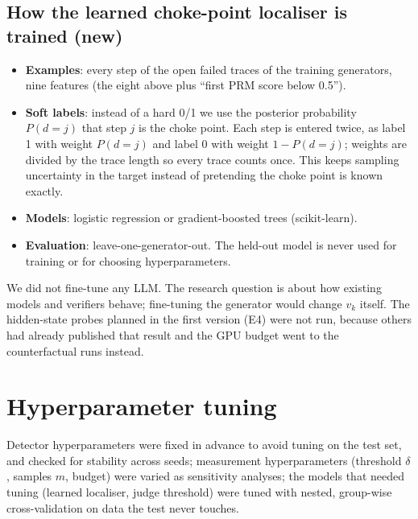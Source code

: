 \documentclass[11pt,a4paper]{article}
\begin{document}
\subsection{How the learned choke-point localiser is trained (new)}
\begin{itemize}
\item \textbf{Examples}: every step of the open failed traces of the training generators, nine
features (the eight above plus ``first PRM score below 0.5'').
\item \textbf{Soft labels}: instead of a hard 0/1 we use the posterior probability $P(d=j)$ that step $j$
is the choke point. Each step is entered twice, as label 1 with weight $P(d=j)$ and label 0 with weight
$1-P(d=j)$; weights are divided by the trace length so every trace counts once. This keeps sampling
uncertainty in the target instead of pretending the choke point is known exactly.
\item \textbf{Models}: logistic regression or gradient-boosted trees (scikit-learn).
\item \textbf{Evaluation}: leave-one-generator-out. The held-out model is never used for training or
for choosing hyperparameters.
\end{itemize}

\begin{caution}
We did not fine-tune any LLM. The research question is about how existing models and verifiers
behave; fine-tuning the generator would change $v_k$ itself. The hidden-state probes planned in the
first version (E4) were not run, because others had already published that result and the GPU budget
went to the counterfactual runs instead.
\end{caution}

\section{Hyperparameter tuning}\label{sec:tuning}
\begin{viva}
Detector hyperparameters were fixed in advance to avoid tuning on the test set, and checked for
stability across seeds; measurement hyperparameters (threshold $\delta$, samples $m$, budget) were
varied as sensitivity analyses; the models that needed tuning (learned localiser, judge threshold)
were tuned with nested, group-wise cross-validation on data the test never touches.
\end{viva}
\end{document}
